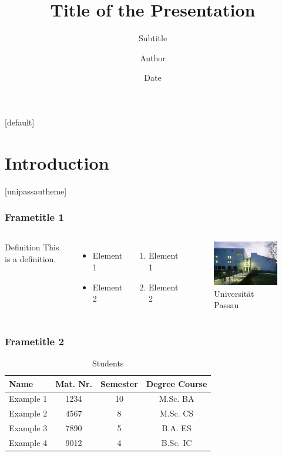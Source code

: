 \documentclass{beamer}
\title[Short Title]{Title of the Presentation}
\subtitle{Subtitle}
\author{Author}
\institute[Fakultät]
{
  Fakultät\\
  Universität Passau\\
}
\date{Date}
\begin{document}
[default]

\section{Introduction}
\begin{frame}
  \titlepage
\end{frame}

[unipassautheme]

\begin{frame}\frametitle{Frametitle 1}

  \begin{columns}[t]
  \column{5cm}
  \begin{block}{Definition}
  This is a definition.
  \end{block}
  \begin{itemize}
    \item Element 1
    \item Element 2
  \end{itemize}
  \begin{enumerate}
    \item Element 1
    \item Element 2
  \end{enumerate}
  \column{5cm}
  \begin{figure}
    \includegraphics[width=5cm]{up.jpg}
    \caption{Universität Passau}
  \end{figure}
  \end{columns}

\end{frame}


\begin{frame}\frametitle{Frametitle 2}

  \begin{table}[ht!]
  \centering
  \begin{tabular}{|lccc|}
    \hline
    Name & Mat. Nr. & Semester & Degree Course \\
    \hline
    Example 1 & 1234 & 10 & M.Sc. BA\\
    Example 2 & 4567 &  8 & M.Sc. CS \\
    Example 3 & 7890 &  5 & B.A. ES \\
    Example 4 & 9012 &  4 & B.Sc. IC \\
    \hline
  \end{tabular}
  \caption{Students}
  \end{table}

\end{frame}
\end{document}
